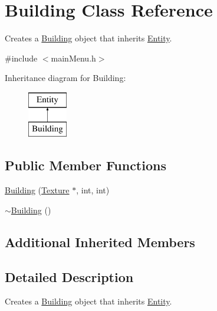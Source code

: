\hypertarget{class_building}{\section{Building Class Reference}
\label{class_building}
}


Creates a \hyperlink{class_building}{Building} object that inherits \hyperlink{class_entity}{Entity}.  




{\ttfamily \#include $<$main\+Menu.\+h$>$}

Inheritance diagram for Building\+:\begin{figure}[H]
\begin{center}
\leavevmode
\includegraphics[height=2.000000cm]{class_building}
\end{center}
\end{figure}
\subsection*{Public Member Functions}
\begin{DoxyCompactItemize}
\item 
\hyperlink{class_building_a87b35657776dd85a29f7aed5f631cf79}{Building} (\hyperlink{class_texture}{Texture} $\ast$, int, int)
\item 
\hyperlink{class_building_ab675c6a382e110b84031956cda708439}{$\sim$\+Building} ()
\end{DoxyCompactItemize}
\subsection*{Additional Inherited Members}


\subsection{Detailed Description}
Creates a \hyperlink{class_building}{Building} object that inherits \hyperlink{class_entity}{Entity}. 

